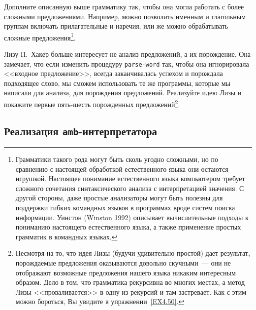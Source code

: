 \begin{exercise}{4.48}%
\label{EX4.48}%
Дополните описанную выше грамматику так, чтобы она
могла работать с более сложными предложениями.  Например, можно
позволить именным и глагольным группам включать прилагательные и
наречия, или же можно обрабатывать сложные 
предложения\footnote{Грамматики 
такого рода могут быть сколь угодно
сложными, но по сравнению с настоящей обработкой естественного языка
они остаются игрушкой.  Настоящее понимание естественного языка
компьютером требует сложного сочетания синтаксического анализа с
интерпретацией значения.  С другой стороны, даже простые анализаторы
могут быть полезны для поддержки гибких командных языков в программах
вроде систем поиска информации. Уинстон (Winston 1992)
описывает вычислительные подходы к пониманию настоящего естественного
языка, а также применение простых грамматик в командных языках.}.
\end{exercise}

\begin{exercise}{4.49}%
\label{EX4.49}%
Лизу П.~Хакер больше интересует не анализ
предложений, а их 
порождение.  Она замечает, что если изменить
процедуру {\tt parse-word} так, чтобы она игнорировала
<<входное предложение>>, всегда заканчивалась успехом и порождала
подходящее слово, мы сможем использовать те же программы, которые мы
написали для анализа, для порождения предложений.  Реализуйте идею Лизы и
покажите первые пять-шесть порожденных предложений\footnote{Несмотря на 
то, что идея Лизы (будучи
удивительно простой) дает результат, порождаемые предложения оказываются 
довольно скучными~--- они не отображают возможные предложения нашего языка
никаким интересным образом.  Дело в том, что грамматика рекурсивна во
многих местах, а метод Лизы <<проваливается>> в одну из рекурсий и
там застревает.  Как с этим можно бороться, Вы увидите в 
упражнении~\ref{EX4.50}.}.
\end{exercise}

\subsection{Реализация {\tt amb}-интерпретатора}
\label{IMPLEMENTING-THE-AMB-EVALUATOR}%

